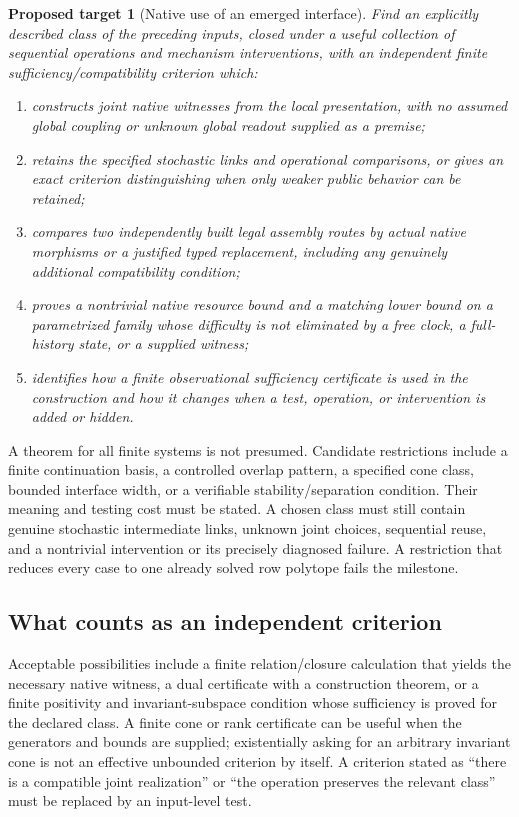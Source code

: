 \documentclass[11pt]{article}
\newtheorem{target}[definition]{Proposed target}
\theoremstyle{remark}
\begin{document}
\begin{target}[Native use of an emerged interface]
\label{target:multistage}
Find an explicitly described class of the preceding inputs, closed under a useful collection of sequential operations and mechanism interventions, with an independent finite sufficiency/compatibility criterion which:
\begin{enumerate}
\item constructs joint native witnesses from the local presentation, with no assumed global coupling or unknown global readout supplied as a premise;
\item retains the specified stochastic links and operational comparisons, or gives an exact criterion distinguishing when only weaker public behavior can be retained;
\item compares two independently built legal assembly routes by actual native morphisms or a justified typed replacement, including any genuinely additional compatibility condition;
\item proves a nontrivial native resource bound and a matching lower bound on a parametrized family whose difficulty is not eliminated by a free clock, a full-history state, or a supplied witness;
\item identifies how a finite observational sufficiency certificate is used in the construction and how it changes when a test, operation, or intervention is added or hidden.
\end{enumerate}
\end{target}

A theorem for all finite systems is not presumed. Candidate restrictions include a finite continuation basis, a controlled overlap pattern, a specified cone class, bounded interface width, or a verifiable stability/separation condition. Their meaning and testing cost must be stated. A chosen class must still contain genuine stochastic intermediate links, unknown joint choices, sequential reuse, and a nontrivial intervention or its precisely diagnosed failure. A restriction that reduces every case to one already solved row polytope fails the milestone.

\subsection{What counts as an independent criterion}

Acceptable possibilities include a finite relation/closure calculation that yields the necessary native witness, a dual certificate with a construction theorem, or a finite positivity and invariant-subspace condition whose sufficiency is proved for the declared class. A finite cone or rank certificate can be useful when the generators and bounds are supplied; existentially asking for an arbitrary invariant cone is not an effective unbounded criterion by itself. A criterion stated as ``there is a compatible joint realization'' or ``the operation preserves the relevant class'' must be replaced by an input-level test.
\end{document}
